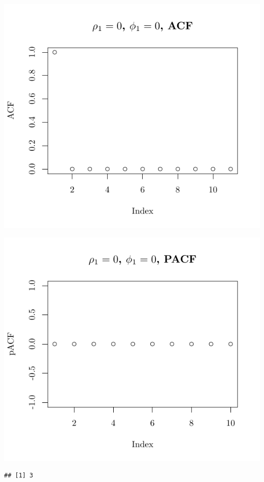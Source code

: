 \documentclass[10pt]{paper}\usepackage[]{graphicx}\usepackage[]{color}
\makeatletter
\def\maxwidth{ %
  \ifdim\Gin@nat@width>\linewidth
    \linewidth
  \else
    \Gin@nat@width
  \fi
}
\newenvironment{kframe}{%
 \def\at@end@of@kframe{}%
 \ifinner\ifhmode%
  \def\at@end@of@kframe{\end{minipage}}%
  \begin{minipage}{\columnwidth}%
 \fi\fi%
 \def\FrameCommand##1{\hskip\@totalleftmargin \hskip-\fboxsep
 \colorbox{shadecolor}{##1}\hskip-\fboxsep
     \hskip-\linewidth \hskip-\@totalleftmargin \hskip\columnwidth}%
 \MakeFramed {\advance\hsize-\width
   \@totalleftmargin\z@ \linewidth\hsize
   \@setminipage}}%
 {\par\unskip\endMakeFramed%
 \at@end@of@kframe}
\newenvironment{knitrout}{}{} %
\makeatother
\begin{document}
\begin{knitrout}
{\centering \includegraphics[width=\maxwidth]{figure/graphics-plotter-15} 

}




{\centering \includegraphics[width=\maxwidth]{figure/graphics-plotter-16} 

}


\begin{kframe}\begin{verbatim}
## [1] 3
\end{verbatim}
\end{kframe}


\end{knitrout}
\end{document}
